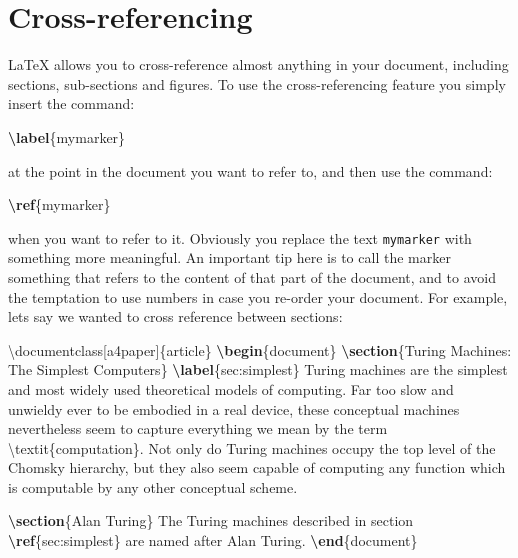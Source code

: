 \documentclass[
]{book}
\newenvironment{Shaded}{\begin{snugshade}}{\end{snugshade}}
\newcommand{\BuiltInTok}[1]{#1}
\newcommand{\ExtensionTok}[1]{#1}
\newcommand{\FunctionTok}[1]{\textcolor[rgb]{0.00,0.00,0.00}{#1}}
\newcommand{\KeywordTok}[1]{\textcolor[rgb]{0.13,0.29,0.53}{\textbf{#1}}}
\newcommand{\NormalTok}[1]{#1}
\begin{document}
\hypertarget{cross-referencing}{%
\section{Cross-referencing}\label{cross-referencing}}

LaTeX allows you to cross-reference almost anything in your document, including sections, sub-sections and figures. To use the cross-referencing feature you simply insert the command:

\begin{Shaded}
\begin{Highlighting}[]
\KeywordTok{\textbackslash{}label}\NormalTok{\{}\ExtensionTok{mymarker}\NormalTok{\}}
\end{Highlighting}
\end{Shaded}

at the point in the document you want to refer to, and then use the command:

\begin{Shaded}
\begin{Highlighting}[]
\KeywordTok{\textbackslash{}ref}\NormalTok{\{}\ExtensionTok{mymarker}\NormalTok{\}}
\end{Highlighting}
\end{Shaded}

when you want to refer to it. Obviously you replace the text \texttt{mymarker} with something more meaningful. An important tip here is to call the marker something that refers to the content of that part of the document, and to avoid the temptation to use numbers in case you re-order your document. For example, lets say we wanted to cross reference between sections:

\begin{Shaded}
\begin{Highlighting}[]
\BuiltInTok{\textbackslash{}documentclass}\NormalTok{[a4paper]\{}\ExtensionTok{article}\NormalTok{\}}
\KeywordTok{\textbackslash{}begin}\NormalTok{\{}\ExtensionTok{document}\NormalTok{\}}
\KeywordTok{\textbackslash{}section}\NormalTok{\{Turing Machines: The Simplest Computers\}}
\KeywordTok{\textbackslash{}label}\NormalTok{\{}\ExtensionTok{sec:simplest}\NormalTok{\}}
\NormalTok{Turing machines are the simplest and most widely used theoretical models of computing. Far too slow and unwieldy ever to be embodied in a real device, these conceptual machines nevertheless seem to capture everything we mean by the term }\FunctionTok{\textbackslash{}textit}\NormalTok{\{computation\}. Not only do Turing machines occupy the top level of the Chomsky hierarchy, but they also seem capable of computing any function which is computable by any other conceptual scheme.}

\KeywordTok{\textbackslash{}section}\NormalTok{\{Alan Turing\}}
\NormalTok{The Turing machines described in section }\KeywordTok{\textbackslash{}ref}\NormalTok{\{}\ExtensionTok{sec:simplest}\NormalTok{\} are named after Alan Turing.}
\KeywordTok{\textbackslash{}end}\NormalTok{\{}\ExtensionTok{document}\NormalTok{\}}
\end{Highlighting}
\end{Shaded}
\end{document}
